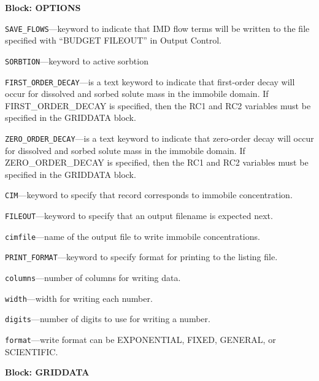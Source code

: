
\item \textbf{Block: OPTIONS}

\begin{description}
\item \texttt{SAVE\_FLOWS}---keyword to indicate that IMD flow terms will be written to the file specified with ``BUDGET FILEOUT'' in Output Control.

\item \texttt{SORBTION}---keyword to active sorbtion

\item \texttt{FIRST\_ORDER\_DECAY}---is a text keyword to indicate that first-order decay will occur for dissolved and sorbed solute mass in the immobile domain.  If FIRST_ORDER_DECAY is specified, then the RC1 and RC2 variables must be specified in the GRIDDATA block.

\item \texttt{ZERO\_ORDER\_DECAY}---is a text keyword to indicate that zero-order decay will occur for dissolved and sorbed solute mass in the immobile domain. If ZERO_ORDER_DECAY is specified, then the RC1 and RC2 variables must be specified in the GRIDDATA block.

\item \texttt{CIM}---keyword to specify that record corresponds to immobile concentration.

\item \texttt{FILEOUT}---keyword to specify that an output filename is expected next.

\item \texttt{cimfile}---name of the output file to write immobile concentrations.

\item \texttt{PRINT\_FORMAT}---keyword to specify format for printing to the listing file.

\item \texttt{columns}---number of columns for writing data.

\item \texttt{width}---width for writing each number.

\item \texttt{digits}---number of digits to use for writing a number.

\item \texttt{format}---write format can be EXPONENTIAL, FIXED, GENERAL, or SCIENTIFIC.

\end{description}
\item \textbf{Block: GRIDDATA}

